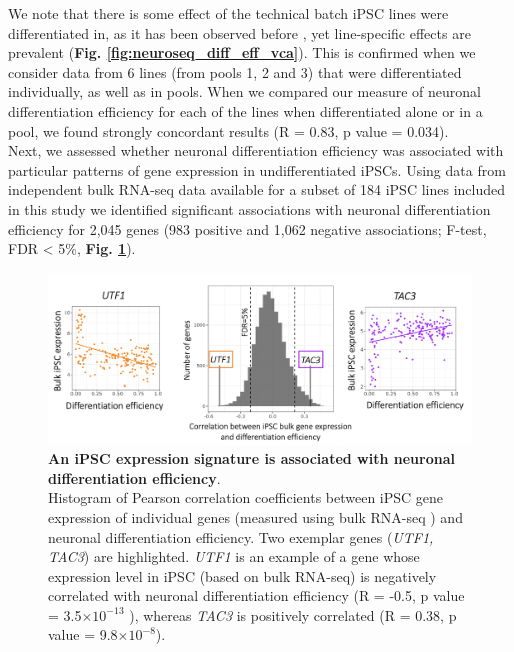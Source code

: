 \newpage

We note that there is some effect of the technical batch iPSC lines were differentiated in, as it has been observed before \cite{kilpinen2017common, schwartzentruber2018molecular}, yet line-specific effects are prevalent (\textbf{Fig. \ref{fig:neuroseq_diff_eff_vca}}).
This is confirmed when we consider data from 6 lines (from pools 1, 2 and 3) that were differentiated individually, as well as in pools.
When we compared our measure of neuronal differentiation efficiency for each of the lines when differentiated alone or in a pool, we found strongly concordant results (R = 0.83, p value = 0.034).\\ 

Next, we assessed whether neuronal differentiation efficiency was associated with particular patterns of gene expression in undifferentiated iPSCs. 
Using data from independent bulk RNA-seq data available for a subset of 184 iPSC lines included in this study \cite{kilpinen2017common, bonder2019systematic} we identified significant associations with neuronal differentiation efficiency for 2,045 genes (983 positive and 1,062 negative associations; F-test, FDR < 5\%, \textbf{Fig. \ref{fig:neuroseq_ips_expression_signature}}). 

\begin{figure}[h]
\centering
\includegraphics[width=16cm]{Chapter5/Fig/neuroseq_ips_bulk_expr_correlations.png}
\caption[iPS expression signature of neuronal differentiation efficiency]{\textbf{An iPSC expression signature is associated with neuronal differentiation efficiency}.\\
Histogram of Pearson correlation coefficients between iPSC gene expression of individual genes (measured using bulk RNA-seq \cite{bonder2019systematic}) and neuronal differentiation efficiency. 
Two exemplar genes (\textit{UTF1, TAC3}) are highlighted. 
\textit{UTF1} is an example of a gene whose expression level in iPSC (based on bulk RNA-seq) is negatively correlated with neuronal differentiation efficiency (R = -0.5, p value = 3.5$ \times 10^{-13}$ ), whereas \textit{TAC3} is positively correlated (R = 0.38, p value = 9.8$ \times 10^{-8}$).}
\label{fig:neuroseq_ips_expression_signature}
\end{figure}

